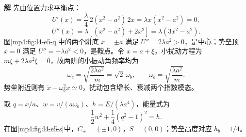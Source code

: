 \documentclass[11pt,openany,fontset=fandol]{ctexbook}
\theoremstyle{definition}\newtheorem{example}{例}[chapter]\newtheorem{exercise}{习题}[chapter]
\newcommand{\SolutionStart}{\par\medskip\ifdim\pagetotal>0pt\ifdim\dimexpr\pagegoal-\pagetotal\relax<3\baselineskip\newpage\fi\fi\noindent\textbf{解}\quad\ignorespaces}
\newenvironment{solution}{\SolutionStart}{\par\medskip}
\begin{document}
\begin{solution}
先由位置力求平衡点：
\[
U'(x)=\frac\lambda4\,2(x^2-a^2)\,2x
=\lambda x(x^2-a^2)=0,
\]
\[
U''(x)=\lambda[(x^2-a^2)+2x^2]=\lambda(3x^2-a^2).
\]
图\ref{mp4:fig:l4-e5-q}中的两个阱底 $x=\pm a$ 满足 $U''=2\lambda a^2>0$，是中心；势垒顶 $x=0$ 满足 $U''=-\lambda a^2<0$，是鞍点。令 $x=a+\xi$，小扰动方程为 $m\ddot\xi+2\lambda a^2\xi=0$，故两阱的小振动角频率均为
\[
\omega_c=\sqrt{\frac{2\lambda a^2}{m}}=\sqrt2\,\omega_b,
\qquad\omega_b=\sqrt{\frac{\lambda a^2}{m}}.
\]
势垒附近则有 $\ddot x-\omega_b^2x\simeq0$，扰动包含增长、衰减两个指数模态。

取 $q=x/a$、$w=v/(a\omega_b)$、$h=E/(\lambda a^4)$，能量式为
\begin{equation}\label{mp4:eq:l4-doublewell}
\frac12w^2+\frac14(q^2-1)^2=h.
\end{equation}
在图\ref{mp4:fig:l4-e5-s}中，$C_\pm=(\pm1,0)$，$S=(0,0)$；势垒高度对应 $h_b=1/4$。


\end{solution}
\end{document}
